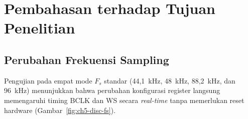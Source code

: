 \section{Pembahasan terhadap Tujuan Penelitian}

\subsection{Perubahan Frekuensi Sampling}

Pengujian pada empat mode $F_s$ standar (44,1~kHz, 48~kHz, 88,2~kHz, dan 96~kHz) menunjukkan bahwa perubahan konfigurasi register  langsung memengaruhi timing BCLK dan WS secara \textit{real-time} tanpa memerlukan reset hardware (Gambar~\ref{fig:ch5-disc-fs}).
